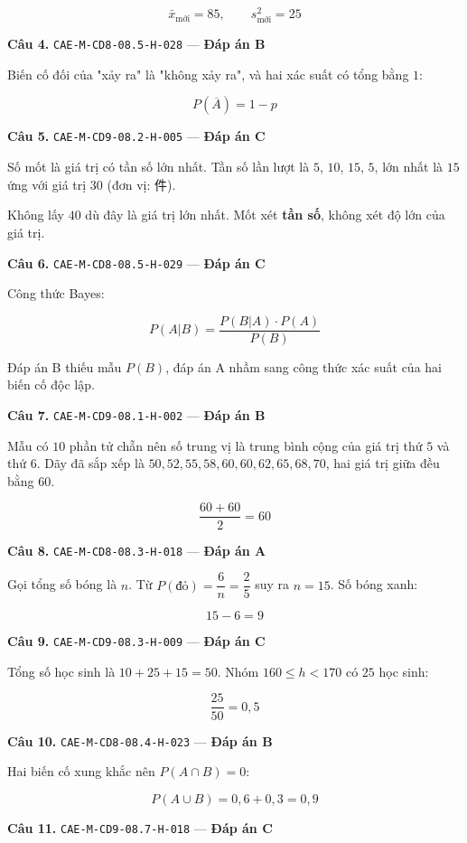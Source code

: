 \documentclass[11pt, a4paper]{article}
\begin{document}
$$\bar{x}_{\text{mới}} = 85, \qquad s^2_{\text{mới}} = 25$$

\textbf{Câu 4.} \texttt{CAE-M-CD8-08.5-H-028} — \textbf{Đáp án B}

Biến cố đối của "xảy ra" là "không xảy ra", và hai xác suất có tổng bằng $1$:

$$P(\overline{A}) = 1 - p$$

\textbf{Câu 5.} \texttt{CAE-M-CD9-08.2-H-005} — \textbf{Đáp án C}

Số mốt là giá trị có tần số lớn nhất. Tần số lần lượt là $5$, $10$, $15$, $5$, lớn nhất là $15$ ứng với giá trị $30$ (đơn vị: 件).

 Không lấy $40$ dù đây là giá trị lớn nhất. Mốt xét \textbf{tần số}, không xét độ lớn của giá trị.

\textbf{Câu 6.} \texttt{CAE-M-CD8-08.5-H-029} — \textbf{Đáp án C}

Công thức Bayes:

$$P(A|B) = \frac{P(B|A) \cdot P(A)}{P(B)}$$

 Đáp án B thiếu mẫu $P(B)$, đáp án A nhầm sang công thức xác suất của hai biến cố độc lập.

\textbf{Câu 7.} \texttt{CAE-M-CD9-08.1-H-002} — \textbf{Đáp án B}

Mẫu có $10$ phần tử chẵn nên số trung vị là trung bình cộng của giá trị thứ $5$ và thứ $6$. Dãy đã sắp xếp là $50, 52, 55, 58, 60, 60, 62, 65, 68, 70$, hai giá trị giữa đều bằng $60$.

$$\frac{60 + 60}{2} = 60$$

\textbf{Câu 8.} \texttt{CAE-M-CD8-08.3-H-018} — \textbf{Đáp án A}

Gọi tổng số bóng là $n$. Từ $P(\text{đỏ}) = \dfrac{6}{n} = \dfrac{2}{5}$ suy ra $n = 15$. Số bóng xanh:

$$15 - 6 = 9$$

\textbf{Câu 9.} \texttt{CAE-M-CD9-08.3-H-009} — \textbf{Đáp án C}

Tổng số học sinh là $10 + 25 + 15 = 50$. Nhóm $160 \le h < 170$ có $25$ học sinh:

$$\frac{25}{50} = 0{,}5$$

\textbf{Câu 10.} \texttt{CAE-M-CD8-08.4-H-023} — \textbf{Đáp án B}

Hai biến cố xung khắc nên $P(A \cap B) = 0$:

$$P(A \cup B) = 0,6 + 0,3 = 0,9$$

\textbf{Câu 11.} \texttt{CAE-M-CD9-08.7-H-018} — \textbf{Đáp án C}
\end{document}
